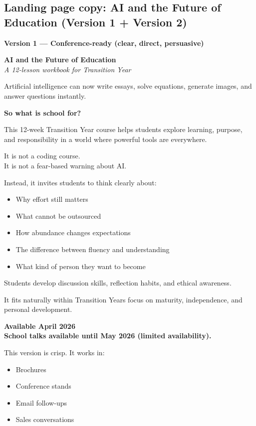 \documentclass[11pt,a4paper]{article}
\begin{document}
\subsection{Landing page copy: AI and the Future of Education (Version 1 + Version 2)}

\textbf{Version 1 --- Conference-ready (clear, direct, persuasive)}

\begin{tcolorbox}[
  colback=white,
  colframe=blue!55!black,
  opacityframe=0.5,
  fonttitle=\bfseries\color{white},
  title={AI landing page copy --- Version 1},
  drop shadow
]
\textbf{AI and the Future of Education}\\
\textit{A 12-lesson workbook for Transition Year}

\medskip

Artificial intelligence can now write essays, solve equations, generate images, and answer questions instantly.

\medskip

\textbf{So what is school for?}

\medskip

This 12-week Transition Year course helps students explore learning, purpose, and responsibility in a world where powerful tools are everywhere.

\medskip

It is not a coding course.\\
It is not a fear-based warning about AI.

\medskip

Instead, it invites students to think clearly about:
\begin{itemize}
  \item Why effort still matters
  \item What cannot be outsourced
  \item How abundance changes expectations
  \item The difference between fluency and understanding
  \item What kind of person they want to become
\end{itemize}

Students develop discussion skills, reflection habits, and ethical awareness.

It fits naturally within Transition Year\textquotesingle s focus on maturity, independence, and personal development.

\medskip

\textbf{Available April 2026}\\
\textbf{School talks available until May 2026 (limited availability).}

\medskip

This version is crisp. It works in:
\begin{itemize}
  \item Brochures
  \item Conference stands
  \item Email follow-ups
  \item Sales conversations
\end{itemize}
\end{tcolorbox}
\end{document}
